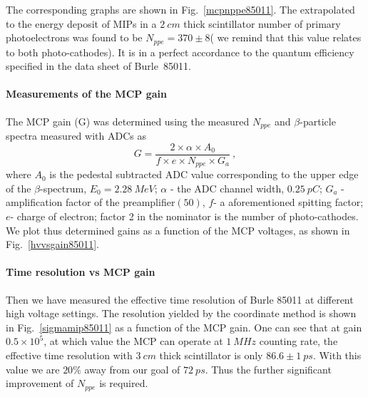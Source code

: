 The corresponding  graphs  are shown in Fig.~\ref{mcpnppe85011}.
The  extrapolated  to the  energy deposit of MIPs  in a $2~cm$ thick scintillator 
number of primary photoelectrons   was found to be
$N_{ppe}=370\pm8$( we remind that this value relates to  both photo-cathodes). 
It is in a perfect accordance  to the quantum efficiency specified in the 
data sheet of Burle~85011. 

\paragraph*{Measurements of the MCP gain}
The MCP gain (G)  was determined using  the measured  $N_{ppe}$ and 
 $\beta$-particle spectra  measured with ADCs as
%
\begin{equation}
G =\frac{2\times \alpha \times A_{0}}{f \times e \times N_{ppe} \times G_a}~,
\label{gain}
\end{equation}
%
where  
$A_{0}$ is the pedestal subtracted ADC value corresponding to the upper edge of the 
$\beta$-spectrum, $E_0=2.28~MeV$;
$\alpha$ -   the ADC channel width, $0.25~pC$;
 $G_a$ - amplification factor of the preamplifier$(50)$, $f$- a aforementioned spitting factor;  $e$- charge of electron; 
factor 2 in the nominator is the number of  photo-cathodes.
We plot thus   determined  gains as a function of the MCP voltages, 
as shown in Fig.~\ref{hvvsgain85011}.
\paragraph*{Time resolution vs MCP gain}
Then  we  have measured the effective time resolution of Burle 85011
at different high voltage settings.
The resolution yielded by the  coordinate method  is shown in Fig.~\ref{sigmamip85011} as 
a function of the MCP gain. 
One can see that at gain $0.5\times10^5$, at which value the 
MCP can operate at $1~MHz$ counting rate\cite{Baturin:2005}, 
the effective time resolution with $3~cm$ thick scintillator 
is  only  $86.6\pm1~ps$.  
With this  value we are $20\%$  away from our goal of $72~ps$. Thus the 
further significant improvement of $N_{ppe}$ is required.
 



